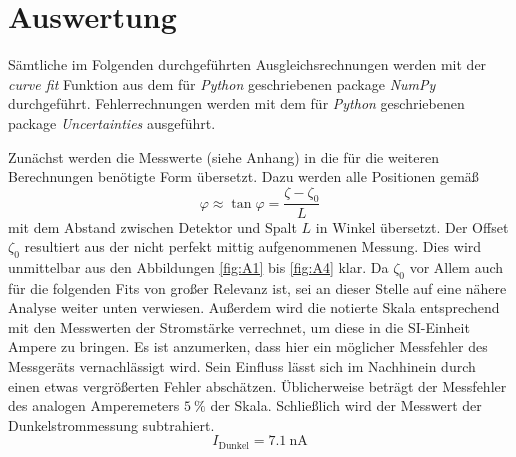 \section{Auswertung}
\label{sec:Auswertung}


Sämtliche im Folgenden durchgeführten Ausgleichsrechnungen werden mit der \emph{curve fit} Funktion aus dem für \emph{Python} geschriebenen package \emph{NumPy}\cite{scipy} durchgeführt. Fehlerrechnungen werden mit dem für \emph{Python} geschriebenen package \emph{Uncertainties}\cite{uncertainties} ausgeführt.

Zunächst werden die Messwerte (siehe Anhang) in die für die weiteren Berechnungen benötigte Form übersetzt. Dazu werden alle Positionen gemäß
\begin{equation}
  \varphi \approx \tan\varphi = \frac{\zeta - \zeta_0}{L}
\end{equation}
mit dem Abstand zwischen Detektor und Spalt $L$ in Winkel übersetzt. Der Offset $\zeta_0$ resultiert aus der nicht perfekt mittig aufgenommenen Messung. Dies wird unmittelbar aus den Abbildungen \ref{fig:A1} bis \ref{fig:A4} klar. Da $\zeta_0$ vor Allem auch für die folgenden Fits von großer Relevanz ist, sei an dieser Stelle auf eine nähere Analyse weiter unten verwiesen. Außerdem wird die notierte Skala entsprechend mit den Messwerten der Stromstärke verrechnet, um diese in die SI-Einheit Ampere zu bringen. Es ist anzumerken, dass hier ein möglicher Messfehler des Messgeräts vernachlässigt wird. Sein Einfluss lässt sich im Nachhinein durch einen etwas vergrößerten Fehler abschätzen. Üblicherweise beträgt der Messfehler des analogen Amperemeters $\SI{5}{\percent}$ der Skala. Schließlich wird der Messwert der Dunkelstrommessung subtrahiert.
\begin{equation*}
  I_\text{Dunkel} = \SI{7.1}{\nano\ampere}
\end{equation*}

